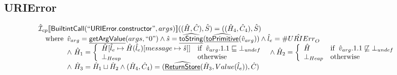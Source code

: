 \documentclass{article}
\newcommand{\SF}[1]{\mbox{\textsf{#1}}}
\newcommand{\wherec}[1]{{\rm where}\begin{array}[t]{l}#1\end{array}}
\newcommand{\ifc}[1]{{\rm if}\begin{array}[t]{l}#1\end{array}}
\newcommand{\owc}{{\rm otherwise}}
\newcommand{\aI}{\hat{\mathcal{I}}}
\newcommand{\lbr}{\llbracket}
\newcommand{\rbr}{\rrbracket}
\newcommand{\hf}[1]{\underline{\sf #1}}
\newcommand{\ahf}[1]{\widehat{\underline{\sf #1}}}
\newcommand{\avarloc}[1]{\hat{\##1}}
\begin{document}
\subsection{URIError}
\[
\begin{array}{l}
\aI _{cp}\lbr \SF{BuiltintCall}(``\SF{URIError.constructor}",args)\rbr((\hat{H},\hat{C}), \hat{S})
  = ((\hat{H}_4, \hat{C}_4), \hat{S})\\
\quad\wherec{
  \hat{v}_{arg} = \hf{getArgValue}(args, ``0")
  \land \hat{s}= \ahf{toString}(\ahf{toPrimitive}(\hat{v}_{arg}))
  \land \hat{l}_e = \avarloc{URIErr}_O\\
  \land\ \hat{H}_1 = \left\{\begin{array}{ll}
      \hat{H}[\hat{l}_e \mapsto \hat{H}(\hat{l}_e)[message \mapsto \hat{s}]]
      & \ifc{\hat{v}_{arg}.1.1 \sqsubseteq \bot_{undef}}\\
      \bot_{Heap} & \owc
    \end{array}\right.
  \land \hat{H}_2 = \left\{\begin{array}{ll}
      \hat{H}
      & \ifc{\hat{v}_{arg}.1.1 \not\sqsubseteq \bot_{undef}}\\
      \bot_{Heap} & \owc
    \end{array}\right.\\
  \land\ \hat{H}_3 = \hat{H}_1 \sqcup \hat{H}_2
  \land (\hat{H}_4, \hat{C}_4) = (\ahf{ReturnStore}(\hat{H}_3, Value(\hat{l}_e)), \hat{C})\\
  }\\

\end{array}
\]
\end{document}
